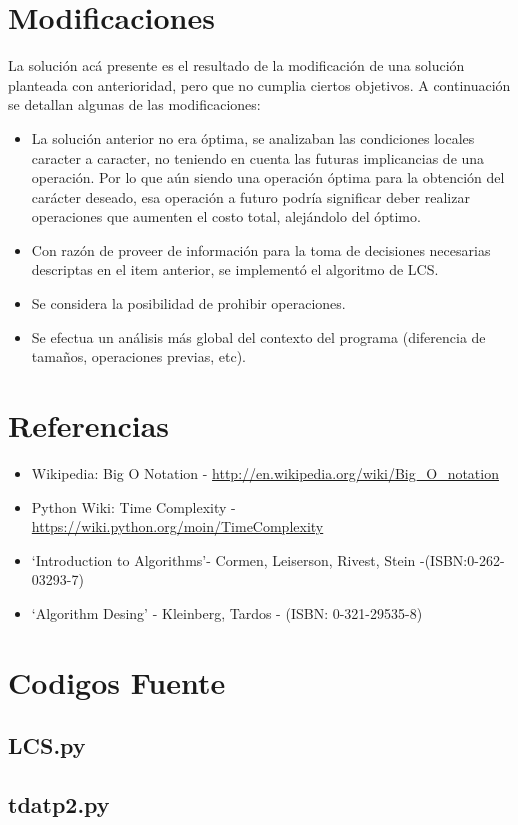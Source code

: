 \documentclass[12pt]{article}
\begin{document}
\newpage
\section{Modificaciones}
	La solución acá presente es el resultado de la modificación de una
	solución planteada con anterioridad, pero que no cumplia ciertos
	objetivos. A continuación se detallan algunas de las modificaciones:
	\begin{itemize}
		\item La solución anterior no era óptima, se analizaban las condiciones
		locales caracter a caracter, no teniendo en cuenta las futuras 
		implicancias de una operación. Por lo que aún siendo una operación
		óptima para la obtención del carácter deseado, esa operación a 
		futuro podría significar deber realizar operaciones que aumenten el costo
		total, alejándolo del óptimo.
		\item Con razón de proveer de información para la toma de decisiones
		necesarias descriptas en el item anterior, se implementó
		el algoritmo de LCS.
		\item Se considera la posibilidad de prohibir operaciones.
		\item Se efectua un análisis más global del contexto del programa
		(diferencia de tamaños, operaciones previas, etc).
	\end{itemize}

\newpage
\section{Referencias}
	\begin{itemize}
		\item Wikipedia: Big O Notation - \url{http://en.wikipedia.org/wiki/Big_O_notation}
		\item Python Wiki: Time Complexity - \url{https://wiki.python.org/moin/TimeComplexity}
		\item `Introduction to Algorithms'- Cormen, Leiserson, Rivest, Stein -(ISBN:0-262-03293-7)
		\item `Algorithm Desing' - Kleinberg, Tardos - (ISBN: 0-321-29535-8)
	\end{itemize}
\newpage
\section{Codigos Fuente}\label{sec:sourcecode}
\subsection{LCS.py}\label{subsec:lcs}


\newpage
\subsection{tdatp2.py}\label{subsec:tdatp2}

\end{document}
